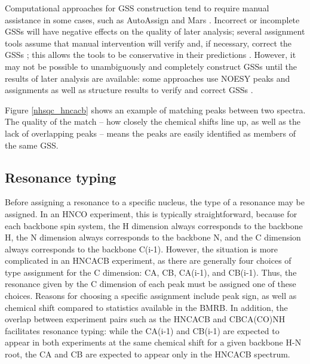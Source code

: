 Computational approaches for GSS construction tend to require manual 
assistance in some cases, such as AutoAssign and Mars 
\cite{autoassign1997, mars}.  Incorrect or 
incomplete GSSs will have negative effects on the quality of later 
analysis; several assignment tools assume that manual intervention will 
verify and, if necessary, correct the GSSs \cite{williamson2009automated}; 
this allows the tools to be conservative in their 
predictions \cite{autoassign1997}.  However, it may not be 
possible to unambiguously and completely construct GSSs until the results 
of later analysis are available: some approaches use NOESY peaks and 
assignments as well as structure results to verify and correct GSSs 
\cite{autoassign1997}.

Figure \ref{nhsqc_hncacb} shows an example of matching peaks between two
spectra.  The quality of the match -- how closely the chemical shifts line up,
as well as the lack of overlapping peaks -- means the peaks are easily
identified as members of the same GSS.

\subsection*{Resonance typing}
Before assigning a resonance to a specific 
nucleus, the type of a resonance may be assigned.  In an HNCO experiment, 
this is typically straightforward, because for each backbone spin system, 
the H dimension always corresponds to the backbone H, the N dimension always 
corresponds to the backbone N, and the C dimension always corresponds to the 
backbone C(i-1).  However, the situation is more complicated in an HNCACB 
experiment, as there are generally four choices of type assignment for 
the C dimension:  CA, CB, CA(i-1), and CB(i-1).  Thus, the resonance given 
by the C dimension of each peak must be assigned one of these choices.  
Reasons for choosing a specific assignment include peak sign, as well as 
chemical shift compared to statistics available in the BMRB.  In addition, 
the overlap between experiment pairs such as the HNCACB and CBCA(CO)NH 
facilitates resonance typing: while the CA(i-1) and CB(i-1) 
are expected to appear in both experiments at the same chemical shift for 
a given backbone H-N root, the CA and CB are expected to appear only in the 
HNCACB spectrum.

